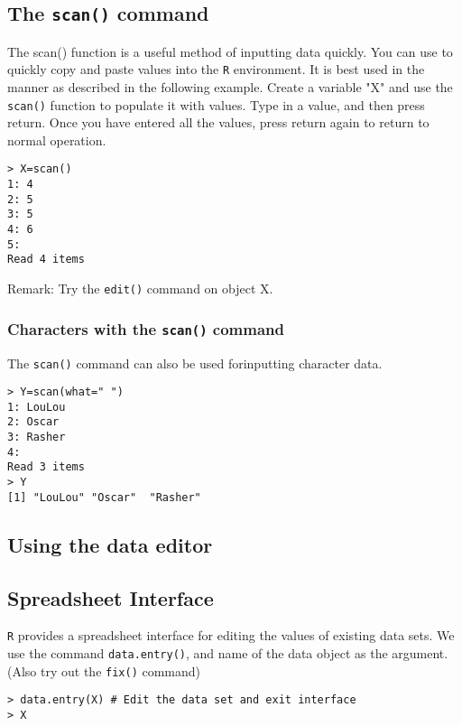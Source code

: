 \documentclass[a4paper,12pt]{article}
\begin{document}
\subsection{The \texttt{scan()} command}
The scan() function is a useful method of inputting data quickly. You can use to quickly copy and paste values into the \texttt{R} environment.
It is best used in the manner as described in the following example.  Create a variable "X" and use the \texttt{scan()} function to populate it with values.
Type in a value, and then press return.
Once you have entered all the values, press return again to return to normal operation.
\begin{framed}
\begin{verbatim}
> X=scan()
1: 4
2: 5
3: 5
4: 6
5:
Read 4 items
\end{verbatim}
\end{framed}
Remark: Try the \texttt{edit()} command on object X.

\subsubsection{Characters with the \texttt{scan()} command}
The \texttt{scan()} command can also be used forinputting character data.
\begin{framed}
\begin{verbatim}
> Y=scan(what=" ")
1: LouLou
2: Oscar
3: Rasher
4: 
Read 3 items
> Y
[1] "LouLou" "Oscar"  "Rasher"
\end{verbatim}
\end{framed}
\subsection{Using the data editor}


\subsection{Spreadsheet Interface}
\texttt{R} provides a spreadsheet interface for editing the values of existing data sets.
We use the command \texttt{data.entry()}, and name of the data object as the argument. (Also try out 
the \texttt{fix()} command)
\begin{framed}
\begin{verbatim}
> data.entry(X) # Edit the data set and exit interface
> X
\end{verbatim}
\end{framed}
\end{document}
